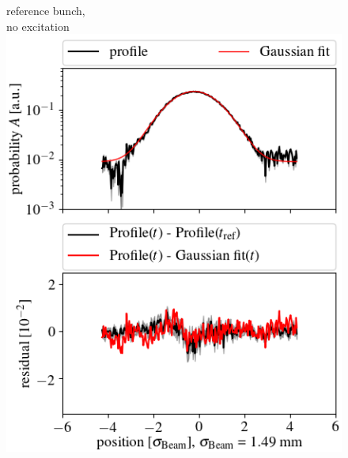 \documentclass[%
 reprint,
 amsmath,amssymb,
 aps,
prstab,
]{revtex4-1}
\begin{document}
\begin{figure}[h]
	\begin{minipage}[t]{0.49\linewidth}
		\centering
		reference bunch,\\ no excitation
		\includegraphics[width=1.0\linewidth]{profile_v_10thv_slot_50.png}
	\end{minipage}
	\begin{minipage}[t]{0.49\linewidth}
		\centering

\end{minipage}
\end{figure}
\end{document}
